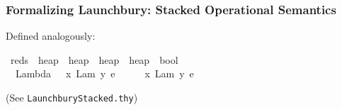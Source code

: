 \documentclass{beamer}
\begin{document}
\begin{frame}
\frametitle{Formalizing Launchbury: Stacked Operational Semantics}

Defined analogously:

\begin{isabelle}
\isamarkupfalse%
\ reds\ {\isacharcolon}{\isacharcolon}\ {\isachardoublequoteopen}heap\ {\isasymRightarrow}\ heap\ {\isasymRightarrow}\ heap\ {\isasymRightarrow}\ heap\ {\isasymRightarrow}\ bool{\isachardoublequoteclose}\isanewline
\ \ \ {\isacharparenleft}{\isachardoublequoteopen}{\isacharunderscore}\ {\isacharcolon}\ {\isacharunderscore}\ {\isasymDown}\ {\isacharunderscore}\ {\isacharcolon}\ {\isacharunderscore}{\isachardoublequoteclose}\ {\isacharbrackleft}{}{}{\isacharcomma}{}{}{\isacharcomma}{}{}{\isacharcomma}{}{}{\isacharbrackright}\ {}{}{\isacharparenright}\isanewline
{}\isanewline
\ \ Lambda{\isacharcolon}\ {\isachardoublequoteopen}{\isasymGamma}\ {\isacharcolon}\ {\isacharparenleft}x{\isacharcomma}\ {\isacharparenleft}Lam\ {\isacharbrackleft}y{\isacharbrackright}{\isachardot}\ e{\isacharparenright}{\isacharparenright}\ {\isacharhash}\ {\isasymGamma}{\isacharprime}\ {\isasymDown}\ {\isasymGamma}\ {\isacharcolon}\ {\isacharparenleft}x{\isacharcomma}\ {\isacharparenleft}Lam\ {\isacharbrackleft}y{\isacharbrackright}{\isachardot}\ e{\isacharparenright}{\isacharparenright}\ {\isacharhash}\ {\isasymGamma}{\isacharprime}{\isachardoublequoteclose}
\end{isabelle}

(See \texttt{LaunchburyStacked.thy})

\end{frame}
\end{document}
